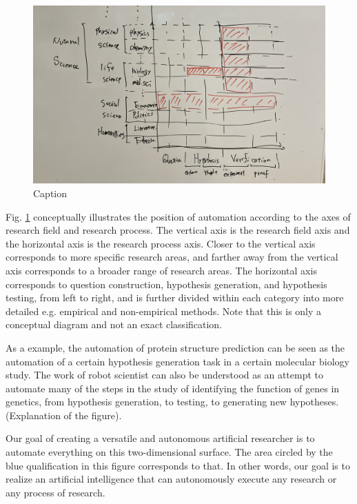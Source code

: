 \begin{figure}[htb]
    \centering
    \includegraphics[width=\linewidth]{figs/generality_matrix.jpg}
    \caption{Caption}
    \label{fig:generality_matrix}
\end{figure}

Fig. \ref{fig:generality_matrix} conceptually illustrates the position of automation according to the axes of research field and research process. The vertical axis is the research field axis and the horizontal axis is the research process axis. Closer to the vertical axis corresponds to more specific research areas, and farther away from the vertical axis corresponds to a broader range of research areas. The horizontal axis corresponds to question construction, hypothesis generation, and hypothesis testing, from left to right, and is further divided within each category into more detailed e.g. empirical and non-empirical methods. Note that this is only a conceptual diagram and not an exact classification.

As a example, the automation of protein structure prediction \cite{jumper2021highly} can be seen as the automation of a certain hypothesis generation task in a certain molecular biology study. The work of robot scientist \cite{king2004functional} can also be understood as an attempt to automate many of the steps in the study of identifying the function of genes in genetics, from hypothesis generation, to testing, to generating new hypotheses. (Explanation of the figure).

Our goal of creating a versatile and autonomous artificial researcher is to automate everything on this two-dimensional surface. The area circled by the blue qualification in this figure corresponds to that. In other words, our goal is to realize an artificial intelligence that can autonomously execute any research or any process of research.



